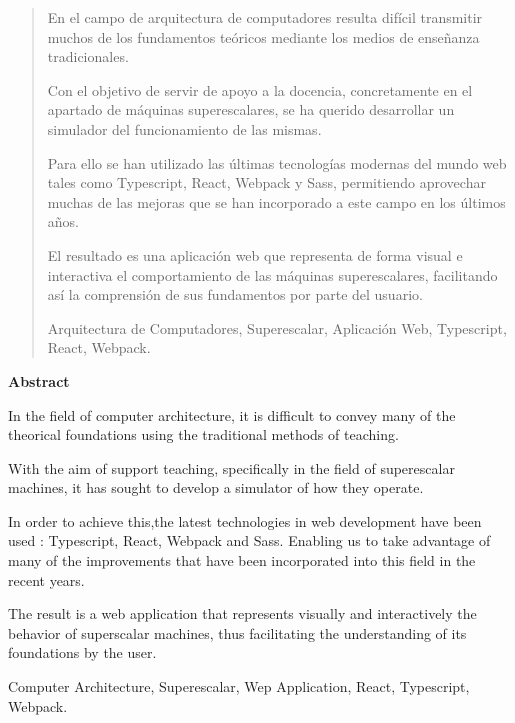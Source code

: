\documentclass[spanish,a4paper,14pt,oneside]{extreport}
\newenvironment{summary}
{\par\noindent\begin{center}\textbf{Abstract}\end{center}\begin{itshape}\par\noindent}
{\end{itshape}}
\newenvironment{keywords}
{\begin{list}{}{\setlength{\leftmargin}{1em}}\item[\hskip\labelsep \bfseries Keywords:]}
{\end{list}}
\newenvironment{palabrasClave}
{\begin{list}{}{\setlength{\leftmargin}{1em}}\item[\hskip\labelsep \bfseries Palabras clave:]}
{\end{list}}
\begin{document}
\newpage  %
\begin{abstract}
{\em

En el campo de arquitectura de computadores resulta difícil transmitir muchos de los fundamentos
teóricos mediante los medios de enseñanza tradicionales.

\bigskip
Con el objetivo de servir de apoyo a la docencia, concretamente en el apartado de máquinas superescalares,
se ha querido desarrollar un simulador del funcionamiento de las mismas.

\bigskip
Para ello se han utilizado las últimas tecnologías modernas del mundo web tales como Typescript, 
React, Webpack y Sass, permitiendo aprovechar muchas de las mejoras que se han incorporado a 
este campo en los últimos años.

\bigskip
El resultado es una aplicación web que representa de forma visual e interactiva el comportamiento
de las máquinas superescalares, facilitando así la comprensión de sus fundamentos por parte del usuario.  
}

\begin{palabrasClave}
Arquitectura de Computadores, Superescalar, Aplicación Web, Typescript, React, Webpack.
\end{palabrasClave}
\end{abstract}


\newpage  %
\begin{summary}
{\em

In the field of computer architecture, it is difficult to convey many of the 
theorical foundations using the traditional methods of teaching.

\bigskip
With the aim of support teaching, specifically in the field of superescalar machines, 
it has sought to develop a simulator of how they operate.

\bigskip
In order to achieve this,the latest technologies in web development have been used : Typescript,
React, Webpack and Sass. Enabling us to take advantage of many of the improvements that have 
been incorporated into this field in the recent years.

\bigskip
The result is a web application that represents visually and interactively the behavior of superscalar machines,
thus facilitating the understanding of its foundations by the user.
}

\begin{keywords}
Computer Architecture, Superescalar, Wep Application, React, Typescript, Webpack.
\end{keywords}

\end{summary}
\end{document}
